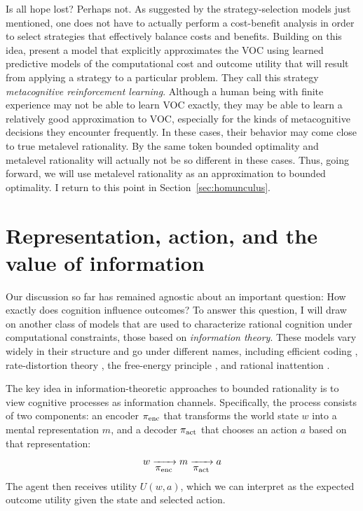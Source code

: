 
Is all hope lost? Perhaps not. As suggested by the strategy-selection models just mentioned, one does not have to actually perform a cost-benefit analysis in order to select strategies that effectively balance costs and benefits. Building on this idea, \citet{lieder2017strategy} present a model that explicitly approximates the VOC using learned predictive models of the computational cost and outcome utility that will result from applying a strategy to a particular problem. They call this strategy \emph{metacognitive reinforcement learning}. Although a human being with finite experience may not be able to learn VOC exactly, they may be able to learn a relatively good approximation to VOC, especially for the kinds of metacognitive decisions they encounter frequently. In these cases, their behavior may come close to true metalevel rationality. By the same token bounded optimality and metalevel rationality will actually not be so different in these cases. Thus, going forward, we will use metalevel rationality as an approximation to bounded optimality. I return to this point in Section~\ref{sec:homunculus}.
 
\section{Representation, action, and the value of information}\label{sec:intro-info}

Our discussion so far has remained agnostic about an important question: How exactly does cognition influence outcomes? To answer this question, I will draw on another class of models that are used to characterize rational cognition under computational constraints, those based on \emph{information theory}. These models vary widely in their structure and go under different names, including efficient coding \citep{barlow1961possible,stocker2006noise}, rate-distortion theory \citep{sims2016rate}, the free-energy principle \citep{friston2010freeenergy}, and rational inattention \citep{sims1998stickiness,caplin2013behavioral}.

The key idea in information-theoretic approaches to bounded rationality is to view cognitive processes as information channels. Specifically, the process consists of two components: an encoder $\pi_{\text{enc}}$ that transforms the world state $w$ into a mental representation $m$, and a decoder $\pi_{\text{act}}$ that chooses an action $a$ based on that representation:
\begin{equation}
  w \xrightarrow[{\displaystyle \pi_{\text{enc}}}]{} m 
    \xrightarrow[{\displaystyle \pi_{\text{act}}}]{} a
\end{equation}
The agent then receives utility $U(w, a)$, which we can interpret as the expected outcome utility given the state and selected action.

